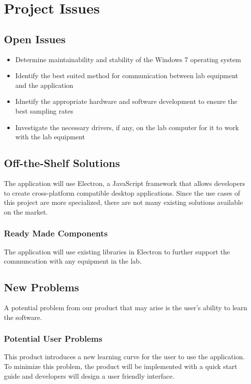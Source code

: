 \documentclass[12pt, titlepage]{article}
\begin{document}
\section{Project Issues}

\subsection{Open Issues}
\begin{itemize}
  \item Determine maintainability and stability of the Windows 7 operating system
  \item Identify the best suited method for communication between lab equipment and the application
  \item Idnetify the appropriate hardware and software development to ensure the best sampling rates
  \item Investigate the necessary drivers, if any, on the lab computer for it to work with the lab equipment
\end{itemize}

\subsection{Off-the-Shelf Solutions}
The application will use Electron, a JavaScript framework that allows developers to create cross-platform compatible desktop applications. 
Since the use cases of this project are more specialized, there are not many existing solutions available on the market.

\subsubsection{Ready Made Components}
The application will use existing libraries in Electron to further support the communcation with any equipment in the lab.

\subsection{New Problems}
 A potential problem from our product that may arise is the user's ability to learn the software.
  \subsubsection{Potential User Problems}
This product introduces a new learning curve for the user to use the application. 
To minimize this problem, the product will be implemented with a quick start guide and developers will design a user friendly interface.
\end{document}
